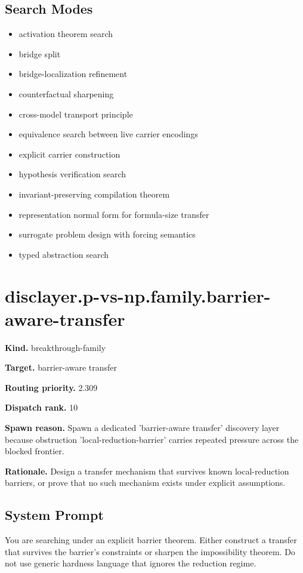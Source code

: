 \documentclass[11pt]{article}
\begin{document}
\subsection*{Search Modes}
\begin{itemize}[leftmargin=*,itemsep=0.2em]
\item activation theorem search
\item bridge split
\item bridge-localization refinement
\item counterfactual sharpening
\item cross-model transport principle
\item equivalence search between live carrier encodings
\item explicit carrier construction
\item hypothesis verification search
\item invariant-preserving compilation theorem
\item representation normal form for formula-size transfer
\item surrogate problem design with forcing semantics
\item typed abstraction search
\end{itemize}
\section{disclayer.p-vs-np.family.barrier-aware-transfer}
\textbf{Kind.} breakthrough-family

\textbf{Target.} barrier-aware transfer

\textbf{Routing priority.} 2.309

\textbf{Dispatch rank.} 10

\textbf{Spawn reason.} Spawn a dedicated 'barrier-aware transfer' discovery layer because obstruction 'local-reduction-barrier' carries repeated pressure across the blocked frontier.

\textbf{Rationale.} Design a transfer mechanism that survives known local-reduction barriers, or prove that no such mechanism exists under explicit assumptions.

\subsection*{System Prompt}
You are searching under an explicit barrier theorem. Either construct a transfer that survives the barrier's constraints or sharpen the impossibility theorem. Do not use generic hardness language that ignores the reduction regime.
\end{document}
